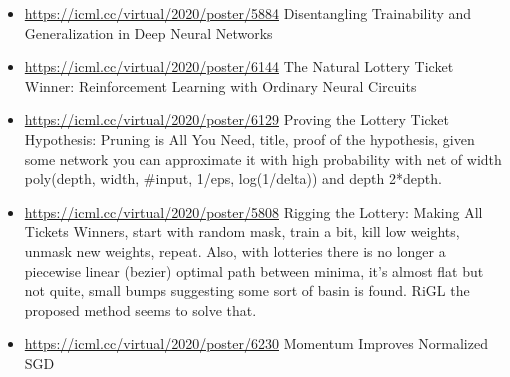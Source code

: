 \begin{itemize}
\item \url{https://icml.cc/virtual/2020/poster/5884}  Disentangling Trainability and Generalization in Deep Neural Networks
\item \url{https://icml.cc/virtual/2020/poster/6144}  The Natural Lottery Ticket Winner: Reinforcement Learning with Ordinary Neural Circuits
\item \url{https://icml.cc/virtual/2020/poster/6129}  Proving the Lottery Ticket Hypothesis: Pruning is All You Need, title, proof of the hypothesis, given some network you can approximate it with high probability with net of width poly(depth, width, #input, 1/eps, log(1/delta)) and depth 2*depth.
\item \url{https://icml.cc/virtual/2020/poster/5808}  Rigging the Lottery: Making All Tickets Winners, start with random mask, train a bit, kill low weights, unmask new weights, repeat. Also, with lotteries there is no longer a piecewise linear (bezier) optimal path between minima, it’s almost flat but not quite, small bumps suggesting some sort of basin is found. RiGL the proposed method seems to solve that.
\item \url{https://icml.cc/virtual/2020/poster/6230}  Momentum Improves Normalized SGD
\end{itemize}
  
